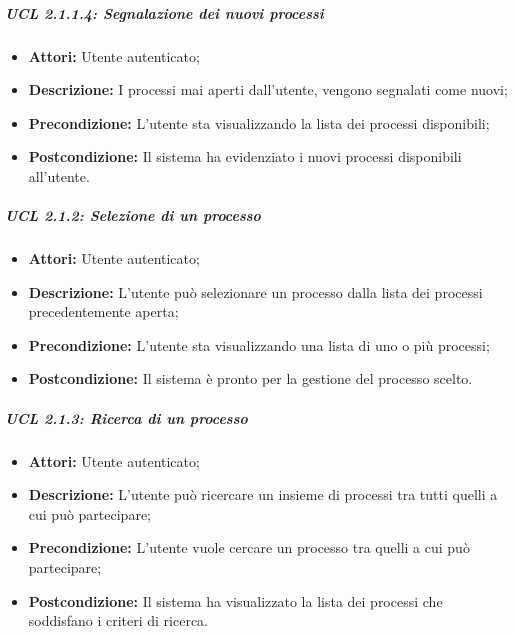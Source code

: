 \subparagraph{UCL 2.1.1.4: Segnalazione dei nuovi processi}
\begin{itemize}
\item \textbf{Attori:} Utente autenticato;
\item \textbf{Descrizione:} I processi mai aperti dall'utente, vengono segnalati come nuovi;
\item \textbf{Precondizione:} L'utente sta visualizzando la lista dei processi disponibili;
\item \textbf{Postcondizione:} Il sistema ha evidenziato i nuovi processi disponibili all'utente.
\end{itemize}

\subparagraph{UCL 2.1.2: Selezione di un processo}
\begin{itemize}
\item \textbf{Attori:} Utente autenticato;
\item \textbf{Descrizione:} L'utente può selezionare un processo dalla lista dei processi precedentemente aperta;
\item \textbf{Precondizione:} L'utente sta visualizzando una lista di uno o più processi;
\item \textbf{Postcondizione:} Il sistema è pronto per la gestione del processo scelto.
\end{itemize}

\subparagraph{UCL 2.1.3: Ricerca di un processo}
\begin{itemize}
\item \textbf{Attori:} Utente autenticato;
\item \textbf{Descrizione:} L'utente può ricercare un insieme di processi tra tutti quelli a cui può partecipare;
\item \textbf{Precondizione:} L'utente vuole cercare un processo tra quelli a cui può partecipare;
\item \textbf{Postcondizione:} Il sistema ha visualizzato la lista dei processi che soddisfano i criteri di ricerca.
\end{itemize}

